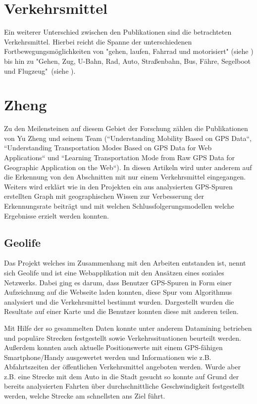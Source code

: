 \section{Verkehrsmittel}
Ein weiterer Unterschied zwischen den Publikationen sind die betrachteten Verkehrsmittel. Hierbei reicht die Spanne der unterschiedenen Fortbewegungsmöglichkeiten von "gehen, laufen, Fahrrad und motorisiert" (siehe \cite{reddy_using_2010}) bis hin zu "Gehen, Zug, U-Bahn, Rad, Auto, Straßenbahn, Bus, Fähre, Segelboot und Flugzeug"\ (siehe \cite{biljecki_transportation_2013}).

\section{Zheng}
Zu den Meilensteinen auf diesem Gebiet der Forschung zählen die Publikationen von Yu Zheng und seinem Team (``Understanding Mobility Based on GPS Data``, ``Understanding Transportation Modes Based on GPS Data for Web Applications`` und ``Learning Transportation Mode from Raw GPS Data for Geographic Application on the Web``). In diesen Artikeln wird unter anderem auf die Erkennung von den Abschnitten mit nur einem Verkehrsmittel eingegangen. Weiters wird erklärt wie in den Projekten ein aus analysierten GPS-Spuren erstellten Graph mit geographischen Wissen zur Verbesserung der Erkennungsrate beiträgt und mit welchen Schlussfolgerungsmodellen welche Ergebnisse erzielt werden konnten. 

\subsection{Geolife}
Das Projekt welches im Zusammenhang mit den Arbeiten entstanden ist, nennt sich Geolife und ist eine Webapplikation mit den Ansätzen eines soziales Netzwerks. Dabei ging es darum, dass Benutzer GPS-Spuren in Form einer Aufzeichnung auf die Webseite laden konnten, diese Spur vom Algorithmus analysiert und die Verkehrsmittel bestimmt wurden. Dargestellt wurden die Resultate auf einer Karte und die Benutzer konnten diese mit anderen teilen. 

Mit Hilfe der so gesammelten Daten konnte unter anderem Datamining betrieben und populäre Strecken festgestellt sowie Verkehrssituationen beurteilt werden. Außerdem konnten auch aktuelle Positionswerte mit einem GPS-fähigen Smartphone/Handy ausgewertet werden und Informationen wie z.B. Abfahrtszeiten der öffentlichen Verkehrsmittel angeboten werden. Wurde aber z.B. eine Strecke mit dem Auto in die Stadt gesucht so konnte auf Grund der bereits analysierten Fahrten über durchschnittliche Geschwindigkeit festgestellt werden, welche Strecke am schnellsten ans Ziel führt.

